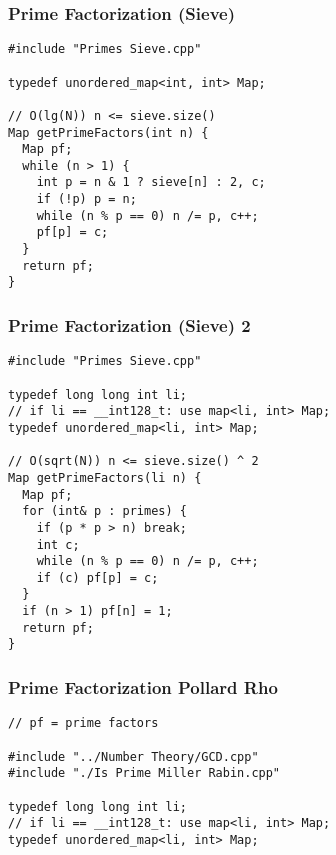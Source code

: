 \documentclass[twoside]{article}
\begin{document}
\begin{multicols*}{2}
\subsubsectionfont{\large\bfseries\sffamily\underline}
\subsubsection*{Prime Factorization (Sieve)}
\begin{verbatim}
#include "Primes Sieve.cpp"

typedef unordered_map<int, int> Map;

// O(lg(N)) n <= sieve.size()
Map getPrimeFactors(int n) {
  Map pf;
  while (n > 1) {
    int p = n & 1 ? sieve[n] : 2, c;
    if (!p) p = n;
    while (n % p == 0) n /= p, c++;
    pf[p] = c;
  }
  return pf;
}
\end{verbatim}

\subsubsectionfont{\large\bfseries\sffamily\underline}
\subsubsection*{Prime Factorization (Sieve) 2}
\begin{verbatim}
#include "Primes Sieve.cpp"

typedef long long int li;
// if li == __int128_t: use map<li, int> Map;
typedef unordered_map<li, int> Map;

// O(sqrt(N)) n <= sieve.size() ^ 2
Map getPrimeFactors(li n) {
  Map pf;
  for (int& p : primes) {
    if (p * p > n) break;
    int c;
    while (n % p == 0) n /= p, c++;
    if (c) pf[p] = c;
  }
  if (n > 1) pf[n] = 1;
  return pf;
}
\end{verbatim}

\subsubsectionfont{\large\bfseries\sffamily\underline}
\subsubsection*{Prime Factorization Pollard Rho}
\begin{verbatim}
// pf = prime factors

#include "../Number Theory/GCD.cpp"
#include "./Is Prime Miller Rabin.cpp"

typedef long long int li;
// if li == __int128_t: use map<li, int> Map;
typedef unordered_map<li, int> Map;


\end{verbatim}
\end{multicols*}
\end{document}

